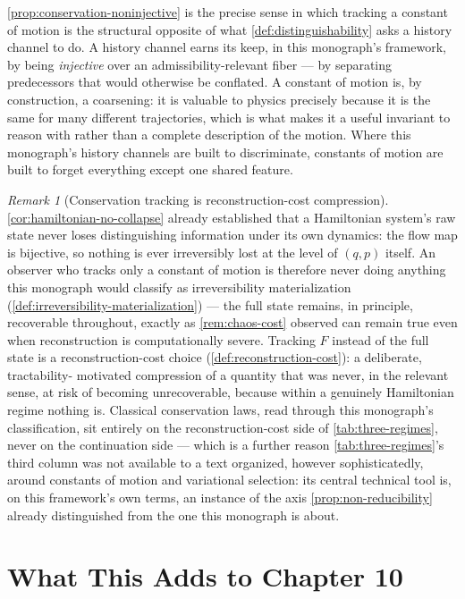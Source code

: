 \documentclass[11pt]{book}
\theoremstyle{plain}
\theoremstyle{definition}
\theoremstyle{remark}
\newtheorem{remark}[theorem]{Remark}
\begin{document}
\cref{prop:conservation-noninjective} is the precise sense in which
tracking a constant of motion is the structural opposite of what
\cref{def:distinguishability} asks a history channel to do. A history
channel earns its keep, in this monograph's framework, by being
\emph{injective} over an admissibility-relevant fiber --- by
separating predecessors that would otherwise be conflated. A constant
of motion is, by construction, a coarsening: it is valuable to physics
precisely because it is the same for many different trajectories,
which is what makes it a useful invariant to reason with rather than a
complete description of the motion. Where this monograph's history
channels are built to discriminate, constants of motion are built to
forget everything except one shared feature.

\begin{remark}[Conservation tracking is reconstruction-cost compression]
\label{rem:conservation-is-cost-side}
\cref{cor:hamiltonian-no-collapse} already established that a
Hamiltonian system's raw state never loses distinguishing information
under its own dynamics: the flow map is bijective, so nothing is ever
irreversibly lost at the level of $(q,p)$ itself. An observer who
tracks only a constant of motion is therefore never doing anything
this monograph would classify as irreversibility materialization
(\cref{def:irreversibility-materialization}) --- the full state remains,
in principle, recoverable throughout, exactly as \cref{rem:chaos-cost}
observed can remain true even when reconstruction is computationally
severe. Tracking $F$ instead of the full state is a reconstruction-cost
choice (\cref{def:reconstruction-cost}): a deliberate, tractability-
motivated compression of a quantity that was never, in the relevant
sense, at risk of becoming unrecoverable, because within a genuinely
Hamiltonian regime nothing is. Classical conservation laws, read
through this monograph's classification, sit entirely on the
reconstruction-cost side of \cref{tab:three-regimes}, never on the
continuation side --- which is a further reason \cref{tab:three-regimes}'s
third column was not available to a text organized, however
sophisticatedly, around constants of motion and variational selection:
its central technical tool is, on this framework's own terms, an
instance of the axis \cref{prop:non-reducibility} already distinguished
from the one this monograph is about.
\end{remark}

\section{What This Adds to Chapter 10}
\end{document}
